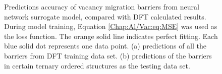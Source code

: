 \begingroup
\begin{figure}[!ht]
  \centering
\caption[Predictions accuracy of vacancy migration barriers from neural network surrogate model, compared with DFT calculated results.]{Predictions accuracy of vacancy migration barriers from neural network surrogate model, compared with DFT calculated results. During model training, Equation \ref{Chap:Al/Vac:eq:MSE} was used as the loss function. The orange solid line indicates perfect fitting. Each blue solid dot represents one data point. (a) predictions of all the barriers from DFT training data set. (b) predictions of the barriers in certain ternary ordered structures as the testing data set.}
\label{Chap:Al/Vac:fig:fitting_all}
\end{figure}
\endgroup


